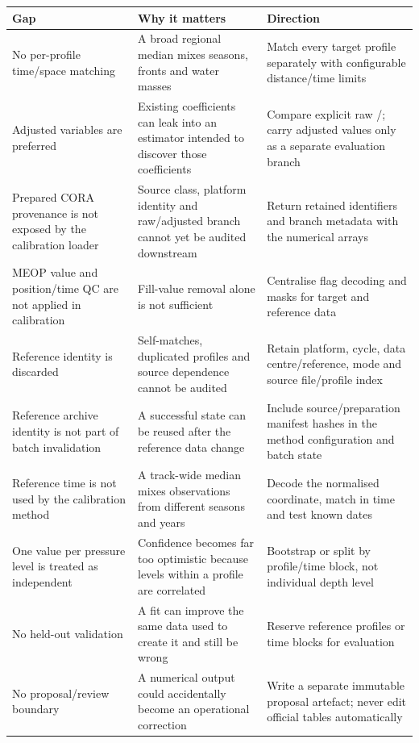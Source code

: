 \documentclass[11pt,a4paper]{article}
\newcommand{\pkg}[1]{\texttt{\detokenize{#1}}}
\begin{document}
\begin{longtable}{>{\raggedright\arraybackslash}p{} >{\raggedright\arraybackslash}p{} >{\raggedright\arraybackslash}p{}}
\toprule
\textbf{Gap} & \textbf{Why it matters} & \textbf{Direction} \\
\midrule
\endhead
No per-profile time/space matching & A broad regional median mixes seasons, fronts and water masses & Match every target profile separately with configurable distance/time limits \\
Adjusted variables are preferred & Existing coefficients can leak into an estimator intended to discover those coefficients & Compare explicit raw \pkg{TEMP}/\pkg{PSAL}; carry adjusted values only as a separate evaluation branch \\
Prepared CORA provenance is not exposed by the calibration loader & Source class, platform identity and raw/adjusted branch cannot yet be audited downstream & Return retained identifiers and branch metadata with the numerical arrays \\
MEOP value and position/time QC are not applied in calibration & Fill-value removal alone is not sufficient & Centralise flag decoding and masks for target and reference data \\
Reference identity is discarded & Self-matches, duplicated profiles and source dependence cannot be audited & Retain platform, cycle, data centre/reference, mode and source file/profile index \\
Reference archive identity is not part of batch invalidation & A successful state can be reused after the reference data change & Include source/preparation manifest hashes in the method configuration and batch state \\
Reference time is not used by the calibration method & A track-wide median mixes observations from different seasons and years & Decode the normalised \pkg{JULD} coordinate, match in time and test known dates \\
One value per pressure level is treated as independent & Confidence becomes far too optimistic because levels within a profile are correlated & Bootstrap or split by profile/time block, not individual depth level \\
No held-out validation & A fit can improve the same data used to create it and still be wrong & Reserve reference profiles or time blocks for evaluation \\
No proposal/review boundary & A numerical output could accidentally become an operational correction & Write a separate immutable proposal artefact; never edit official tables automatically \\
\bottomrule
\end{longtable}
\end{document}
